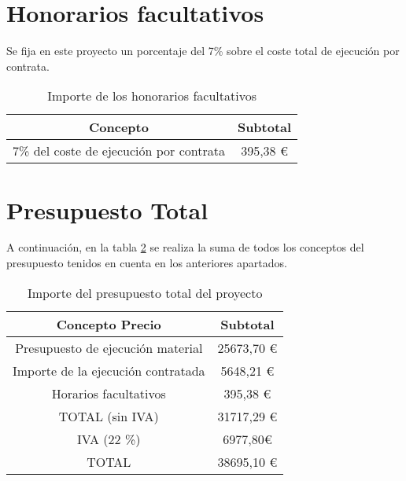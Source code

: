 \section{Honorarios facultativos}
\label{sec:presupuesto-facultativos}

Se fija en este proyecto un porcentaje del 7\% sobre el coste total de ejecución por contrata.

\begin{table}[H]
\centering
\begin{tabular}{|c|c|}
\hline
Concepto                                & Subtotal \\ \hline
7\% del coste de ejecución por contrata & 395,38 \euro        \\ \hline
\end{tabular}
\caption{Importe de los honorarios facultativos}
\label{tab:honorarios}
\end{table}

\section{Presupuesto Total}
\label{sec:presupuesto-total}

A continuación, en la tabla \ref{tab:presupuesto_total} se realiza la suma de todos los conceptos del presupuesto tenidos en cuenta en los anteriores apartados.

\begin{table}[H]
\centering
\begin{tabular}{|c|c|}
\hline
Concepto Precio                    & Subtotal \\ \hline
Presupuesto de ejecución material  & 25673,70 \euro        \\ \hline
Importe de la ejecución contratada & 5648,21 \euro        \\ \hline
Horarios facultativos              & 395,38 \euro        \\ \hline
TOTAL (sin IVA)                    & 31717,29 \euro        \\ \hline
IVA (22 \%)                        & 6977,80\euro        \\ \hline
TOTAL                              & 38695,10 \euro        \\ \hline
\end{tabular}
\caption{Importe del presupuesto total del proyecto}
\label{tab:presupuesto_total}
\end{table}

